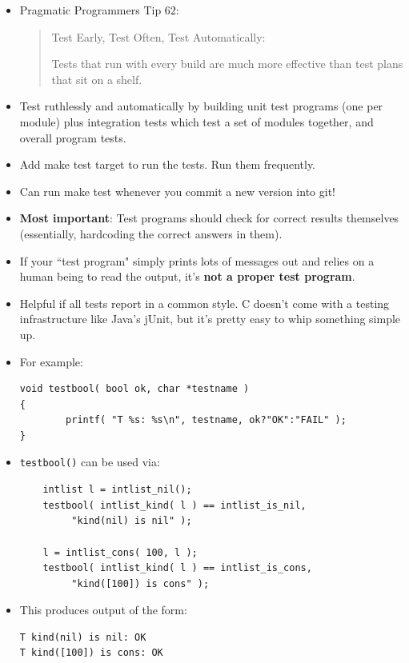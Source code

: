 \documentclass[aspectratio=169]{beamer}
\newcommand{\pitem}{\pause \item}
\begin{document}
\begin{frame}[fragile]
    \begin{itemize}
      \item
	Pragmatic Programmers Tip 62:
\begin{quote}
Test Early, Test Often, Test Automatically:

Tests that run with every build are much more
effective than test plans that sit on a shelf.
\end{quote}
    \pause
    \item
      Test \alert{ruthlessly} and \alert{automatically}
      by building \alert{unit test} programs (one per module) plus
      \alert{integration} tests which test a set of modules together,
      and \alert{overall} program tests.
    \item
      Add \alert{make test} target to run the tests.
      Run them frequently.
    \item
      Can run \alert{make test}
      whenever you commit a new version into git!
    \pitem
      {\bf Most important}:
      Test programs should check for correct results themselves
      (essentially, hardcoding the correct answers in them).
    \pitem
      If your ``test program" simply prints lots of messages out
      and relies on a human being to read the output, it's
      {\bf not a proper test program}.

    \pitem
      Helpful if all tests report in a common style.
      C doesn't come with a testing infrastructure like Java's jUnit,
      but it's pretty easy to whip something simple up.
    \end{itemize}
\end{frame}

\begin{frame}[fragile]
    \begin{itemize}
      \item
      For example:

{\small
\begin{verbatim}
void testbool( bool ok, char *testname )
{
        printf( "T %s: %s\n", testname, ok?"OK":"FAIL" );
}
\end{verbatim}
}
	\item
	\verb+testbool()+ can be used via:

{\small
\begin{verbatim}
	intlist l = intlist_nil();
	testbool( intlist_kind( l ) == intlist_is_nil,
	     "kind(nil) is nil" );

	l = intlist_cons( 100, l );
	testbool( intlist_kind( l ) == intlist_is_cons,
	     "kind([100]) is cons" );
\end{verbatim}
}

      \item
      This produces output of the form:
{\small
\begin{verbatim}
T kind(nil) is nil: OK
T kind([100]) is cons: OK
\end{verbatim}
}

    \end{itemize}
\end{frame}
\end{document}
